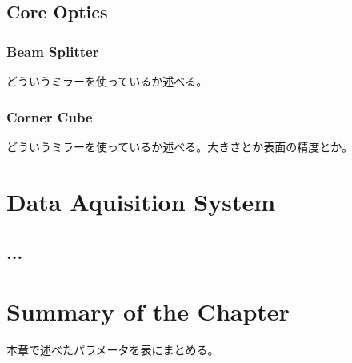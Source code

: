 \subsection{Core Optics}
\subsubsection{Beam Splitter}
どういうミラーを使っているか述べる。
\subsubsection{Corner Cube}
どういうミラーを使っているか述べる。大きさとか表面の精度とか。




\section{Data Aquisition System}
\subsection{...}




\section{Summary of the Chapter} %
本章で述べたパラメータを表にまとめる。
